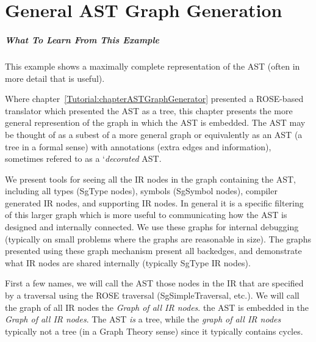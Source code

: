 \chapter{General AST Graph Generation}
\label{Tutorial:chapterGeneralASTGraphGeneration}

\paragraph{What To Learn From This Example}
This example shows a maximally complete representation of the AST 
(often in more detail that is useful).

Where chapter~\ref{Tutorial:chapterASTGraphGenerator}
presented a ROSE-based translator which presented the AST as a tree, this chapter
presents the more general represention of the graph in which the AST is embedded.
The AST may be thought of as a subest of a more general graph or equivalently as
an AST (a tree in a formal sense) with annotations (extra edges and information),
sometimes refered to as a `{\em decorated} AST.

We present tools for seeing all the IR nodes in the graph containing the AST, including all types 
(SgType nodes), symbols (SgSymbol nodes), compiler generated IR nodes, and 
supporting IR nodes. In general
it is a specific filtering of this larger graph which is more useful to communicating
how the AST is designed and internally connected.  We use these graphs for internal 
debugging (typically on small problems where the graphs are reasonable in size).
The graphs presented using these graph mechanism present all backedges, and
demonstrate what IR nodes are shared internally (typically SgType IR nodes).

First a few names, we will call the AST those nodes in the IR that are 
specified by a traversal using the ROSE traversal (SgSimpleTraversal, etc.).
We will call the graph of all IR nodes the {\em Graph of all IR nodes}.
the AST is embedded in the {\em Graph of all IR nodes}.  The AST {\em is} a tree,
while the {\em graph of all IR nodes} typically not a tree (in a Graph Theory sense)
since it typically contains cycles.

